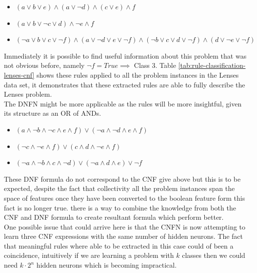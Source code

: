 \begin{itemize}
	\item {} $(a \lor b \lor e) \land (a \lor \lnot d) \land (c \lor e) \land f$
	\item {} $(a \lor b \lor \lnot c \lor d) \land \lnot e \land f$
	\item {} $(\lnot a \lor b \lor c \lor \lnot f) \land (a \lor \lnot d \lor e \lor \lnot f) \land (\lnot b \lor c \lor d \lor \lnot f) \land (d \lor \lnot e \lor \lnot f)$
\end{itemize}

Immediately it is possible to find useful information about this problem that was not obvious before, namely $\lnot f = True \implies $ Class 3. Table \ref{tab:rule-classification-lenses-cnf} shows these rules applied to all the problem instances in the Lenses data set, it demonstrates that these extracted rules are able to fully describe the Lenses problem.\\

The DNFN might be more applicable as the rules will be more insightful, given its structure as an OR of ANDs.\\

\begin{itemize}
	\item {} $(a \land \lnot b \land \lnot c \land e \land f) \lor (\lnot a \land \lnot d \land e \land f)$
	\item {} $(\lnot c \land \lnot e \land f) \lor (c \land d \land \lnot e \land f)$
	\item {} $(\lnot a \land \lnot b \land c \land \lnot d) \lor (\lnot a \land d \land e) \lor \lnot f$
\end{itemize}

These DNF formula do not correspond to the CNF give above but this is to be expected, despite the fact that collectivity all the problem instances span the space of features once they have been converted to the boolean feature form this fact is no longer true.    there is a way to combine the knowledge from both the CNF and DNF formula to create resultant formula which perform better.\\

One possible issue that could arrive here is that the CNFN is now attempting to learn three CNF expressions with the same number of hidden neurons. The fact that meaningful rules where able to be extracted in this case could of been a coincidence, intuitively if we are learning a problem with $k$ classes then we could need $k \cdot 2^n$ hidden neurons which is becoming impractical.

